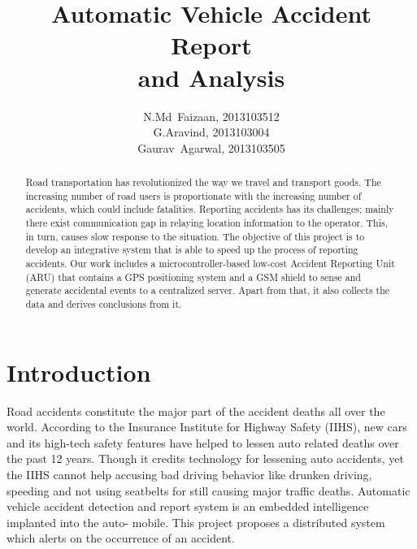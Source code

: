 \documentclass{llncs}
\begin{document}
\title{Automatic Vehicle Accident Report\\ and Analysis}

\author{N.Md~Faizaan, 2013103512\\
        G.Aravind, 2013103004\\
        Gaurav~Agarwal, 2013103505}%

\maketitle

\begin{abstract}
Road transportation has revolutionized the way we travel and transport goods. The increasing number of road users is proportionate with the increasing number of accidents, which could include fatalities. Reporting accidents has its challenges; mainly there exist communication gap in relaying location information to the operator. This, in turn, causes slow response to the situation. The objective of this project is to develop an integrative system that is able to speed up the process of reporting accidents. Our work includes a microcontroller-based low-cost Accident Reporting Unit (ARU) that contains a GPS positioning system and a GSM shield to sense and generate accidental events to a centralized server. Apart from that, it also collects the data and derives conclusions from it.
\end{abstract}

\section{Introduction}
\label{sec:introduction}
Road accidents constitute the major part of the accident deaths all over the world. According to the Insurance Institute for Highway Safety (IIHS), new cars and its high-tech safety features have helped to lessen auto related deaths over the past 12 years. Though it credits technology for lessening auto accidents, yet the IIHS cannot help accusing bad driving behavior like drunken driving, speeding and not using seatbelts for still causing major traffic deaths. Automatic vehicle accident detection and report system is an embedded intelligence implanted into the auto- mobile. This project proposes a distributed system which alerts on the occurrence of an accident.
\end{document}
